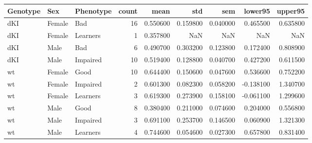 \begin{tabular}{lllrrrrrr}
\toprule
Genotype & Sex & Phenotype & count & mean & std & sem & lower95 & upper95 \\
\midrule
dKI & Female & Bad & 16 & 0.550600 & 0.159800 & 0.040000 & 0.465500 & 0.635800 \\
dKI & Female & Learners & 1 & 0.357800 & NaN & NaN & NaN & NaN \\
dKI & Male & Bad & 6 & 0.490700 & 0.303200 & 0.123800 & 0.172400 & 0.808900 \\
dKI & Male & Impaired & 10 & 0.519400 & 0.128800 & 0.040700 & 0.427200 & 0.611500 \\
wt & Female & Good & 10 & 0.644400 & 0.150600 & 0.047600 & 0.536600 & 0.752200 \\
wt & Female & Impaired & 2 & 0.601300 & 0.082300 & 0.058200 & -0.138100 & 1.340700 \\
wt & Female & Learners & 3 & 0.619300 & 0.273900 & 0.158100 & -0.061100 & 1.299600 \\
wt & Male & Good & 8 & 0.380400 & 0.211000 & 0.074600 & 0.204000 & 0.556800 \\
wt & Male & Impaired & 3 & 0.691100 & 0.253700 & 0.146500 & 0.060900 & 1.321300 \\
wt & Male & Learners & 4 & 0.744600 & 0.054600 & 0.027300 & 0.657800 & 0.831400 \\
\bottomrule
\end{tabular}
